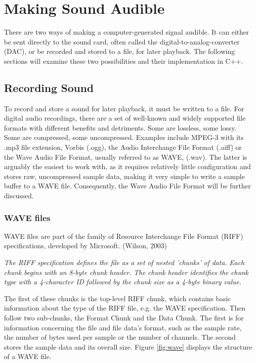 \chapter{Making Sound Audible}

There are two ways of making a computer-generated signal audible. It can either be sent directly to the sound card, often called the digital-to-analog-converter (DAC), or be recorded and stored to a file, for later playback. The following sections will examine these two possibilities and their implementation in C++.

\section{Recording Sound}

To record and store a sound for later playback, it must be written to a file. For digital audio recordings, there are a set of well-known and widely supported file formats with different benefits and detriments. Some are lossless, some lossy. Some are compressed, some uncompressed. Examples include MPEG-3 with its .mp3 file extension, Vorbis (.ogg), the Audio Interchange File Format (.aiff) or the Wave Audio File Format, usually referred to as WAVE, (.wav). The latter is arguably the easiest to work with, as it requires relatively little configuration and stores raw, uncompressed sample data, making it very simple to write a sample buffer to a WAVE file. Consequently, the Wave Audio File Format will be further discussed.\\

\subsection{WAVE files}

\noindent WAVE files are part of the family of Resource Interchange File Format (RIFF) specifications, developed by Microsoft. (Wilson, 2003)

\begin{blockquote}
  \emph{The RIFF specification defines the file as a set of nested 'chunks' of data. Each chunk begins with an 8-byte chunk header. The chunk header identifies the chunk type with a 4-character ID followed by the chunk size as a 4-byte binary value.} 
\end{blockquote}

\noindent The first of these chunks is the top-level RIFF chunk, which contains basic information about the type of the RIFF file, e.g. the WAVE specification. Then follow two sub-chunks, the Format Chunk and the Data Chunk. The first is for information concerning the file and file data's format, such as the sample rate, the number of bytes used per sample or the number of channels. The second stores the sample data and its overall size. Figure \ref{fig:wave} displays the structure of a WAVE file.

